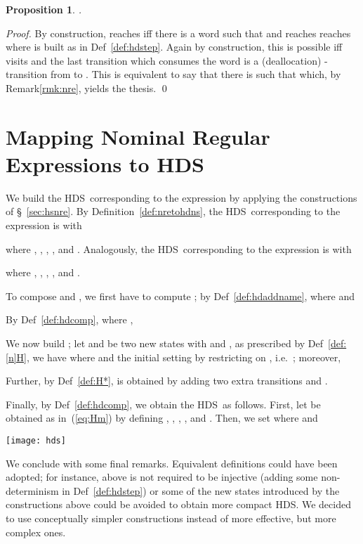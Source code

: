 \documentclass[runningheads,a4paper]{llncs}
\newcommand{\longversion}[1]{#1}
\newcommand{\hds}{HDS}
\newcommand{\hdns}{HDS}
\newtheorem{proposition}{Theorem}[section]
\newtheorem{proposition}{Proposition}[section]
\begin{document}
\begin{proposition}\label{prop:[n]H}
  .
\end{proposition}
\longversion{
\begin{proof}
  By construction, 
  reaches  iff there is a word  such that  and  reaches reaches  where
   is built as in Def~\ref{def:hdstep}.
Again by construction, this is possible iff  visits  and the last transition which consumes the
  word is a (deallocation) -transition from  to .
This is equivalent to say that there is 
  such that  which, by Remark\ref{rmk:nre}, yields
  the thesis.
\qed
\end{proof}
}



\section{Mapping Nominal Regular Expressions to \hdns}
We build the \hdns\  corresponding
to the expression  by applying the
constructions of \S~\ref{sec:hsnre}.
By Definition~\ref{def:nretohdns}, the \hdns\ corresponding to the
expression  is  with

where , ,
, , and .
Analogously, the \hdns\ corresponding to the expression  is  with

where , ,
, , and .

To compose  and , we first have to compute
; by Def~\ref{def:hdaddname},
 where  and


By Def~\ref{def:hdcomp},  where ,


We now build ; let
 and  be two new states with  and
, as prescribed by Def~\ref{def:[n]H}, we
have  where  and
 the initial setting  by restricting
 on , i.e.~;
moreover,


Further, by Def~\ref{def:H*},  is obtained
by adding two extra transitions  and .

Finally, by Def~\ref{def:hdcomp}, we obtain the \hds\  as follows.
First, let  be obtained as in~(\ref{eq:Hm})
by defining , , , , and .
Then, we set 
where  and



  \begin{center}
    \begin{minipage}{\linewidth}\centering
      \texttt{[image: hds]}
    \end{minipage}
  \end{center}



We conclude with some final remarks.
Equivalent definitions could have been adopted; for instance, 
above is not required to be injective (adding some non-determinism in
Def~\ref{def:hdstep}) or some of the new states introduced by the
constructions above could be avoided to obtain more compact \hdns.
We decided to use conceptually simpler constructions instead of more
effective, but more complex ones.
\end{document}
